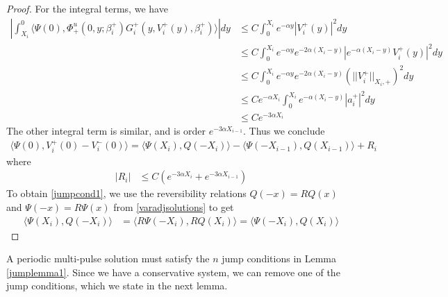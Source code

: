 \documentclass[thesis.tex]{subfiles}
\begin{document}
\begin{lemma}
\begin{proof}
For the integral terms, we have
\begin{align*}
\left| \int_{X_i}^0 \langle \Psi(0), \Phi_+^u(0, y; \beta_i^+) G_i^+(y, V_i^+(y),\beta_i^+) \rangle \right| dy &\leq C \int_0^{X_i} e^{-\alpha y} |V_i^+(y)|^2 dy \\
&\leq C \int_0^{X_i} e^{-\alpha y} e^{-2 \alpha(X_i - y)}|e^{-\alpha (X_i - y)} V_i^+(y)|^2 dy \\
&\leq C \int_0^{X_i} e^{-\alpha y} e^{-2 \alpha(X_i - y)}(||V_i^+||_{X_i, +})^2 dy \\
&\leq C e^{-\alpha X_i} \int_0^{X_i} e^{-\alpha (X_i - y)} |a_i^+|^2 dy \\
&\leq C e^{-3 \alpha X_i}
\end{align*}
The other integral term is similar, and is order $e^{-3 \alpha X_{i-1}}$. Thus we conclude
\begin{align*}
\langle \Psi(0), V_i^+(0) - V_i^-(0) \rangle = 
\langle \Psi(X_i), Q(-X_i) \rangle - \langle \Psi(-X_{i-1}), Q(X_{i-1}) \rangle + R_i
\end{align*}
where 
\begin{align*}
|R_i| &\leq C( e^{-3 \alpha X_i} +  e^{-3 \alpha X_{i-1}})
\end{align*}
To obtain \cref{jumpcond1}, we use the reversibility relations $Q(-x) = RQ(x)$ and $\Psi(-x) = R\Psi(x)$ from \cref{varadjsolutions} to get
\begin{align*}
\langle \Psi(X_i), Q(-X_i) \rangle 
&= \langle R\Psi(-X_i), R Q(X_i) \rangle 
= \langle \Psi(-X_i), Q(X_i) \rangle 
\end{align*}
\end{proof}
\end{lemma}

A periodic multi-pulse solution must satisfy the $n$ jump conditions in Lemma \ref{jumplemma1}. Since we have a conservative system, we can remove one of the jump conditions, which we state in the next lemma.
\end{document}
